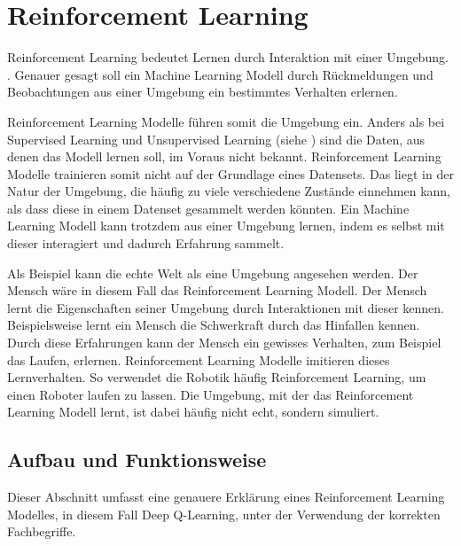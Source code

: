 \section{Reinforcement Learning}\label{chap:t_rl}
Reinforcement Learning bedeutet Lernen durch Interaktion mit einer Umgebung.
\cite{osinski_what_2018}. Genauer gesagt soll ein Machine Learning Modell durch
Rückmeldungen und Beobachtungen aus einer Umgebung ein bestimmtes Verhalten
erlernen.

Reinforcement Learning Modelle führen somit die Umgebung ein. Anders als bei
Supervised Learning und Unsupervised Learning (siehe ) sind
die Daten, aus denen das Modell lernen soll, im Voraus nicht bekannt.
Reinforcement Learning Modelle trainieren somit nicht auf der Grundlage eines
Datensets. Das liegt in der Natur der Umgebung, die häufig zu viele verschiedene
Zustände einnehmen kann, als dass diese in einem Datenset gesammelt werden
könnten. Ein Machine Learning Modell kann trotzdem aus einer Umgebung lernen,
indem es selbst mit dieser interagiert und dadurch Erfahrung sammelt.
\cite{piyush_verma_what_2021}

Als Beispiel kann die echte Welt als eine Umgebung angesehen werden. Der Mensch
wäre in diesem Fall das Reinforcement Learning Modell. Der Mensch lernt die
Eigenschaften seiner Umgebung durch Interaktionen mit dieser kennen.
Beispielsweise lernt ein Mensch die Schwerkraft durch das Hinfallen kennen.
Durch diese Erfahrungen kann der Mensch ein gewisses Verhalten, zum Beispiel das
Laufen, erlernen. Reinforcement Learning Modelle imitieren dieses Lernverhalten.
So verwendet die Robotik häufig Reinforcement Learning, um einen Roboter laufen
zu lassen. Die Umgebung, mit der das Reinforcement Learning Modell lernt, ist
dabei häufig nicht echt, sondern simuliert.

\subsection{Aufbau und Funktionsweise}\label{sub:t_rl_func}
Dieser Abschnitt umfasst eine genauere Erklärung eines Reinforcement Learning
Modelles, in diesem Fall Deep Q-Learning, unter der Verwendung der korrekten
Fachbegriffe.

